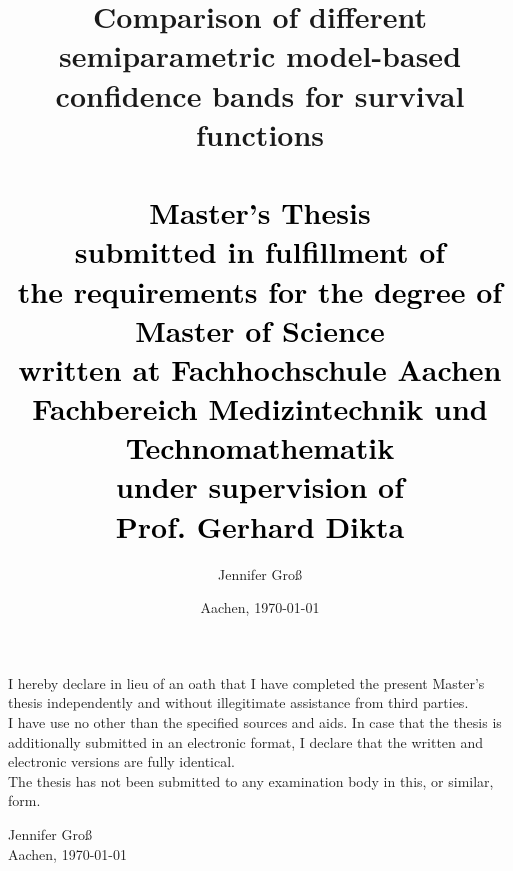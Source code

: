 

\title{\huge{Comparison of different semiparametric model-based confidence bands for survival functions}\\
	\textcolor{black}{
       	  \vspace*{5mm} \\
	  \Huge{Master's Thesis}\\
	  \vspace*{5mm}
	  \normalsize{submitted in fulfillment of\\the requirements for the degree of\\Master of Science}\\
	  \small{written at Fachhochschule Aachen\\Fachbereich Medizintechnik und Technomathematik\\
                 under supervision of\\
                 \textbf{Prof. Gerhard Dikta}}
        }
} %

\author{Jennifer Groß}

\date{\normalsize{Aachen, \monthyeardate\today}}



\maketitle

\cleardoublepage
\thispagestyle{empty}

\newlength{\erklStart}
\addtolength{\erklStart}{\textheight}
\addtolength{\erklStart}{-40ex}
\vspace*{50ex}

\noindent I hereby declare in lieu of an oath that I have completed the present Master’s thesis independently and without illegitimate assistance from third parties. 
\\I have use no other than the specified sources and aids. In case that the thesis is additionally submitted in an electronic format, I declare that the written and electronic versions are fully identical. 
\\The thesis has not been submitted to any examination body in this, or similar, form. \\

\noindent \hspace{5em}
\begin{minipage}{20em}
	\vspace*{20ex}
	Jennifer Groß\\
	Aachen, \today
\end{minipage}

